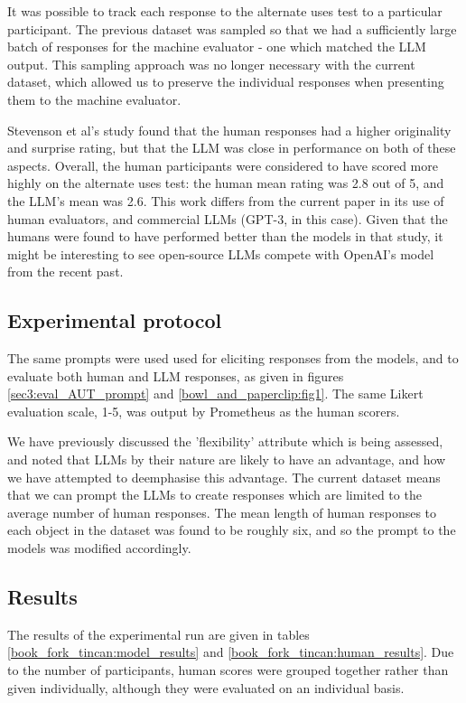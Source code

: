 \documentclass{article}
\begin{document}
It was possible to track each response to the alternate uses test to a particular participant. The previous dataset was sampled so that we had a sufficiently large batch of responses for the machine evaluator - one which matched the LLM output. This sampling approach was no longer necessary with the current dataset, which allowed us to preserve the individual responses when presenting them to the machine evaluator.

Stevenson et al's study found that the human responses had a higher originality and surprise rating, but that the LLM was close in performance on both of these aspects. Overall, the human participants were considered to have scored more highly on the alternate uses test: the human mean rating was 2.8 out of 5, and the LLM's mean was 2.6. This work differs from the current paper in its use of human evaluators, and commercial LLMs (GPT-3, in this case). Given that the humans were found to have performed better than the models in that study, it might be interesting to see open-source LLMs compete with OpenAI's model from the recent past. 

\subsection{Experimental protocol}

The same prompts were used used for eliciting responses from the models, and to evaluate both human and LLM responses, as given in figures \ref{sec3:eval_AUT_prompt} and \ref{bowl_and_paperclip:fig1}. The same Likert evaluation scale, 1-5, was output by Prometheus as the human scorers. 

We have previously discussed the 'flexibility' attribute which is being assessed, and noted that LLMs by their nature are likely to have an advantage, and how we have attempted to deemphasise this advantage. The current dataset means that we can prompt the LLMs to create responses which are limited to the average number of human responses. The mean length of human responses to each object in the dataset was found to be roughly six, and so the prompt to the models was modified accordingly. 

\subsection{Results}

The results of the experimental run are given in tables \ref{book_fork_tincan:model_results} and \ref{book_fork_tincan:human_results}. Due to the number of participants, human scores were grouped together rather than given individually, although they were evaluated on an individual basis.
\end{document}
